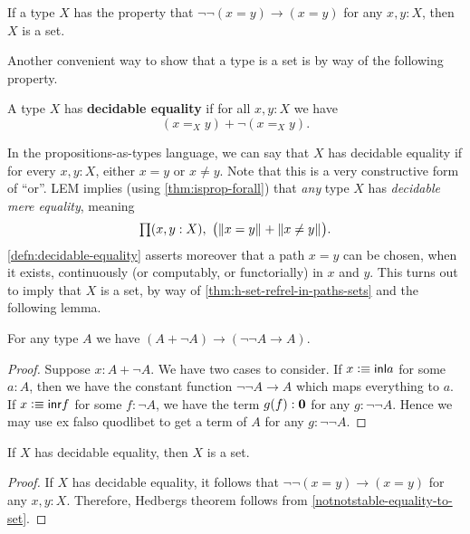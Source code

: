 \begin{cor}\label{notnotstable-equality-to-set}
  If a type $X$ has the property that $\neg\neg(x=y)\to(x=y)$ for any $x,y:X$, then $X$ is a set.
\end{cor}

Another convenient way to show that a type is a set is by way of the following property.

\begin{defn}\label{defn:decidable-equality}
 A type $X$ has \textbf{decidable equality} if for all $x, y : X$ we have
 \[(x =_X y) + \neg (x =_X y).\]
\end{defn}

In the propositions-as-types language, we can say that $X$ has decidable equality if for every $x,y:X$, either $x=y$ or $x\neq y$.
Note that this is a very constructive form of ``or''.
LEM implies (using \autoref{thm:isprop-forall}) that \emph{any} type $X$ has \emph{decidable mere equality}, meaning
\[\prd{x,y:X} \big(\brck{x=y} + \brck{x\neq y}\big).\]
\autoref{defn:decidable-equality} asserts moreover that a path $x=y$ can be chosen, when it exists, continuously (or computably, or
functorially) in $x$ and $y$.
This turns out to imply that $X$ is a set, by way of \autoref{thm:h-set-refrel-in-paths-sets} and the following lemma.

\begin{lem}
For any type $A$ we have $(A+\neg A)\to(\neg\neg A\to A)$.
\end{lem}

\begin{proof}
Suppose $x:A+\neg A$. We have two cases to consider.
If $x\vcentcolon\equiv{\mathsf{inl}}{a}$ for some $a:A$, then we have the constant function $\neg\neg A
\to A$ which maps everything to $a$. If $x\vcentcolon\equiv{\mathsf{inr}}{f}$ for some $f:\neg A$,
we have the term $g(f):\mathbf{0}$ for any $g:\neg\neg A$. Hence we may use
ex falso quodlibet to get a term of $A$ for any $g:\neg\neg A$.
\end{proof}

\begin{thm}[Hedberg]\label{thm:hedberg}
  If $X$ has decidable equality, then $X$ is a set.
\end{thm}

\begin{proof}
If $X$ has decidable equality, it follows that $\neg\neg(x=y)\to(x=y)$ for any
$x,y:X$. Therefore, Hedbergs theorem follows from 
\autoref{notnotstable-equality-to-set}.
\end{proof}


